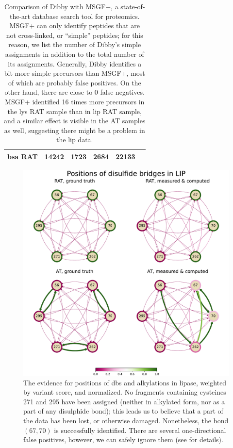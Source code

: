 \begin{table}[hb]
\begin{tabular}{@{}llllll@{}}
    \gls*{bsa} RAT                                       & 14242                           & 1723                                                                   & 2684                              & 22133 &             \\ \bottomrule
  \end{tabular}
  \caption{Comparison of Dibby with MSGF+, a state-of-the-art database search tool for proteomics. MSGF+ can only identify peptides that are not cross-linked, or ``simple'' peptides; for this reason, we list the number of Dibby's simple assignments in addition to the total number of its assignments. Generally, Dibby identifies a bit more simple precursors than MSGF+, most of which are probably false positives. On the other hand, there are close to 0 false negatives. MSGF+ identified 16 times more precursors in the \gls*{lys} RAT sample than in \gls*{lip} RAT sample, and a similar effect is visible in the AT samples as well, suggesting there might be a problem in the \gls*{lip} data.}\label{tbl:measurements}
\end{table}

\begin{figure}
  \centering
  \includegraphics[width=0.9\linewidth]{img/lip.pdf}
  \caption{The evidence for positions of \glspl*{db} and alkylations in lipase, weighted by variant score, and normalized. No fragments containing cysteines 271 and 295 have been assigned (neither in alkylated form, nor as a part of any disulphide bond); this leads us to believe that a part of the data has been lost, or otherwise damaged. Nonetheless, the bond \((67, 70)\) is successfully identified. There are several one-directional false positives, however, we can safely ignore them (see  for details).}\label{fig:lip}
\end{figure}


